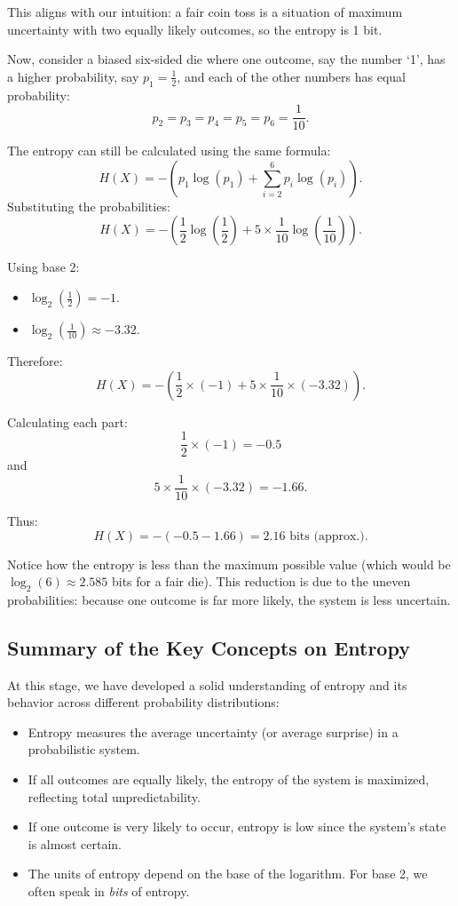 \documentclass[12pt,a4paper]{article}
\newenvironment{exbox}[1][]{%
  \begin{tcolorbox}[enhanced, breakable, colback=excolor, colframe=brown!50!black, title=#1, fonttitle=\bfseries, arc=3pt, boxrule=0.5pt]
}{\end{tcolorbox}}
\begin{document}
This aligns with our intuition: a fair coin toss is a situation of maximum uncertainty with two equally likely outcomes, so the entropy is 1 bit.

\begin{exbox}[Example: Loaded Dice]
    Now, consider a biased six-sided die where one outcome, say the number ‘1’, has a higher probability, say $p_1 = \frac{1}{2}$, and each of the other numbers has equal probability:
    \[
    p_2 = p_3 = p_4 = p_5 = p_6 = \frac{1}{10}.
    \]
    
    The entropy can still be calculated using the same formula:
    \[
    H(X) = - \left( p_1 \log(p_1) + \sum_{i=2}^{6} p_i \log(p_i) \right).
    \]
    Substituting the probabilities:
    \[
    H(X) = - \left( \frac{1}{2} \log\left(\frac{1}{2}\right) + 5 \times \frac{1}{10} \log\left(\frac{1}{10}\right) \right).
    \]

    Using base 2:
    \begin{itemize}
        \item $\log_2\left(\frac{1}{2}\right) = -1$.
        \item $\log_2\left(\frac{1}{10}\right) \approx -3.32$.
    \end{itemize}

    Therefore:
    \[
    H(X) = - \left( \frac{1}{2} \times (-1) + 5 \times \frac{1}{10} \times (-3.32) \right).
    \]

    Calculating each part:
    \[
    \frac{1}{2} \times (-1) = -0.5
    \]
    and
    \[
    5 \times \frac{1}{10} \times (-3.32) = -1.66.
    \]

    Thus:
    \[
    H(X) = -(-0.5 - 1.66) = 2.16 \text{ bits (approx.)}.
    \]
\end{exbox}

Notice how the entropy is less than the maximum possible value (which would be $\log_2(6) \approx 2.585$ bits for a fair die). This reduction is due to the uneven probabilities: because one outcome is far more likely, the system is less uncertain.

\subsection{Summary of the Key Concepts on Entropy}

At this stage, we have developed a solid understanding of entropy and its behavior across different probability distributions:

\begin{itemize}
    \item Entropy measures the average uncertainty (or average surprise) in a probabilistic system.
    \item If all outcomes are equally likely, the entropy of the system is maximized, reflecting total unpredictability.
    \item If one outcome is very likely to occur, entropy is low since the system’s state is almost certain.
    \item The units of entropy depend on the base of the logarithm. For base 2, we often speak in \emph{bits} of entropy.
\end{itemize}
\end{document}
